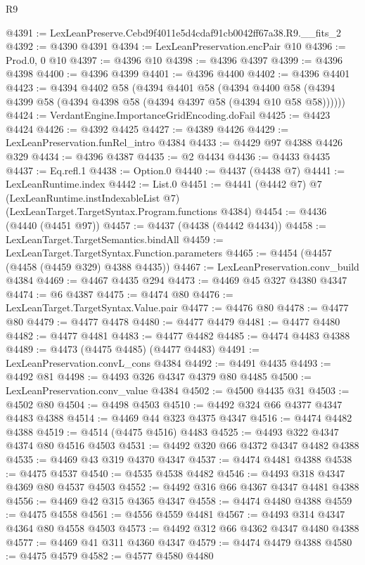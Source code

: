 \begin{lexlean}{R9}
\begin{coremodule}
@4391 := LexLeanPreserve.Cebd9f4011e5d4cdaf91cb0042ff67a38.R9.__fits_2
@4392 := @4390 @4391
@4394 := LexLeanPreservation.encPair @10
@4396 := Prod.{0, 0} @10
@4397 := @4396 @10
@4398 := @4396 @4397
@4399 := @4396 @4398
@4400 := @4396 @4399
@4401 := @4396 @4400
@4402 := @4396 @4401
@4423 := @4394
    @4402
    @58
    (@4394
      @4401
      @58
      (@4394 @4400 @58 (@4394 @4399 @58 (@4394 @4398 @58 (@4394 @4397 @58 (@4394 @10 @58 @58))))))
@4424 := VerdantEngine.ImportanceGridEncoding.doFail
@4425 := @4423 @4424
@4426 := @4392 @4425
@4427 := @4389 @4426
@4429 := LexLeanPreservation.funRel_intro @4384
@4433 := @4429 @97 @4388 @4426 @329
@4434 := @4396 @4387
@4435 := @2 @4434
@4436 := @4433 @4435
@4437 := Eq.refl.{1}
@4438 := Option.{0}
@4440 := @4437 (@4438 @7)
@4441 := LexLeanRuntime.index
@4442 := List.{0}
@4451 := @4441
    (@4442 @7)
    @7
    (LexLeanRuntime.instIndexableList @7)
    (LexLeanTarget.TargetSyntax.Program.functions @4384)
@4454 := @4436 (@4440 (@4451 @97))
@4457 := @4437 (@4438 (@4442 @4434))
@4458 := LexLeanTarget.TargetSemantics.bindAll
@4459 := LexLeanTarget.TargetSyntax.Function.parameters
@4465 := @4454 (@4457 (@4458 (@4459 @329) @4388 @4435))
@4467 := LexLeanPreservation.conv_build @4384
@4469 := @4467 @4435 @294
@4473 := @4469 @45 @327 @4380 @4347
@4474 := @6 @4387
@4475 := @4474 @80
@4476 := LexLeanTarget.TargetSyntax.Value.pair
@4477 := @4476 @80
@4478 := @4477 @80
@4479 := @4477 @4478
@4480 := @4477 @4479
@4481 := @4477 @4480
@4482 := @4477 @4481
@4483 := @4477 @4482
@4485 := @4474 @4483 @4388
@4489 := @4473 (@4475 @4485) (@4477 @4483)
@4491 := LexLeanPreservation.convL_cons @4384
@4492 := @4491 @4435
@4493 := @4492 @81
@4498 := @4493 @326 @4347 @4379 @80 @4485
@4500 := LexLeanPreservation.conv_value @4384
@4502 := @4500 @4435 @31
@4503 := @4502 @80
@4504 := @4498 @4503
@4510 := @4492 @324 @66 @4377 @4347 @4483 @4388
@4514 := @4469 @44 @323 @4375 @4347
@4516 := @4474 @4482 @4388
@4519 := @4514 (@4475 @4516) @4483
@4525 := @4493 @322 @4347 @4374 @80 @4516 @4503
@4531 := @4492 @320 @66 @4372 @4347 @4482 @4388
@4535 := @4469 @43 @319 @4370 @4347
@4537 := @4474 @4481 @4388
@4538 := @4475 @4537
@4540 := @4535 @4538 @4482
@4546 := @4493 @318 @4347 @4369 @80 @4537 @4503
@4552 := @4492 @316 @66 @4367 @4347 @4481 @4388
@4556 := @4469 @42 @315 @4365 @4347
@4558 := @4474 @4480 @4388
@4559 := @4475 @4558
@4561 := @4556 @4559 @4481
@4567 := @4493 @314 @4347 @4364 @80 @4558 @4503
@4573 := @4492 @312 @66 @4362 @4347 @4480 @4388
@4577 := @4469 @41 @311 @4360 @4347
@4579 := @4474 @4479 @4388
@4580 := @4475 @4579
@4582 := @4577 @4580 @4480

\end{coremodule}
\end{lexlean}

